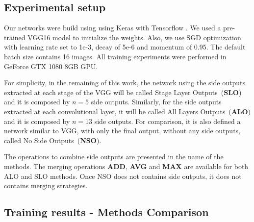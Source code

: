 \subsection{Experimental setup}
   
Our networks were build using using Keras \cite{chollet2015keras} with Tensorflow \cite{tensorflow2015-whitepaper}. We used a pre-trained VGG16 model to initialize the weights. Also, we use SGD optimization with learning rate set to 1e-3, decay of 5e-6 and momentum of 0.95. The default batch size contains 16 images. All training experiments were performed in GeForce GTX 1080 8GB GPU.

For simplicity, in the remaining of this work, the network using the side outputs extracted at each stage of the VGG will be called Stage Layer Outputs~(\textbf{SLO}) and it is composed by $n=5$ side outputs. Similarly, for the side outputs extracted at each convolutional layer, it will be called All Layers Outputs~(\textbf{ALO}) and it is composed by $n=13$ side outputs. For comparison, it is also defined a network similar to VGG, with only the final output, without any side outputs, called No Side Outputs~(\textbf{NSO}).

The operations to combine side outputs are presented in the name of the methods. The merging operations \textbf{ADD}, \textbf{AVG} and \textbf{MAX} are available for both ALO and SLO methods. Once NSO does not contains side outputs, it does not contains merging strategies.

\subsection{Training results - Methods Comparison}

